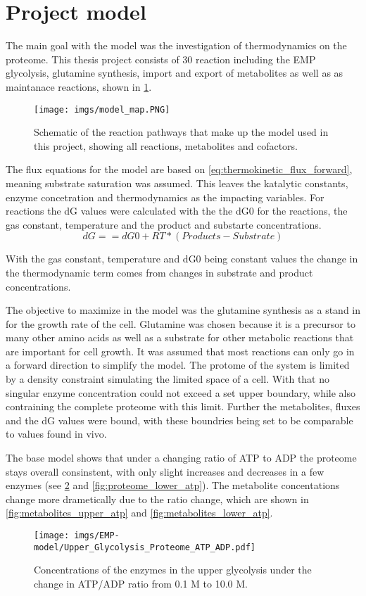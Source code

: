 \section{Project model}
The main goal with the model was the investigation of thermodynamics on the proteome. 
This thesis project consists of 30 reaction including the EMP glycolysis, glutamine synthesis, import and export of metabolites as well as as maintanace reactions, shown in \ref{fig:model_map}. 
\begin{figure}[H]
    \centering
    \texttt{[image: imgs/model\_map.PNG]}
    \caption{Schematic of the reaction pathways that make up the model used in this project, showing all reactions, metabolites and cofactors.}
    \label{fig:model_map}
\end{figure}

The flux equations for the model are based on \ref{eq:thermokinetic_flux_forward}, meaning substrate saturation was assumed. This leaves the katalytic constants, enzyme concetration and thermodynamics as the impacting variables.
For reactions the dG values were calculated with the the dG0 for the reactions, the gas constant, temperature and the product and substarte concentrations.
\begin{equation}
    dG == dG0 + RT * (Products - Substrate)
    \label{eq:general_dG}
\end{equation}

With the gas constant, temperature and dG0 being constant values the change in the thermodynamic term comes from changes in substrate and product concentrations. 

The objective to maximize in the model was the glutamine synthesis as a stand in for the growth rate of the cell. Glutamine was chosen because it is a precursor to many other amino acids as well as a substrate for other metabolic reactions that are important for cell growth.
It was assumed that most reactions can only go in a forward direction to simplify the model. 
The protome of the system is limited by a density constraint simulating the limited space of a cell. With that no singular enzyme concentration could not exceed a set upper boundary, while also contraining the complete proteome with this limit.
Further the metabolites, fluxes and the dG values were bound, with these boundries being set to be comparable to values found in vivo. 

The base model shows that under a changing ratio of ATP to ADP the proteome stays overall consinstent, with only slight increases and decreases in a few enzymes (see \ref{fig:proteome_upper_atp} and \ref{fig:proteome_lower_atp}). The metabolite concentations change more drametically due to the ratio change, which are shown in \ref{fig:metabolites_upper_atp} and \ref{fig:metabolites_lower_atp}. 
\begin{figure}[H]
    \centering
    \texttt{[image: imgs/EMP-model/Upper\_Glycolysis\_Proteome\_ATP\_ADP.pdf]}
    \caption{Concentrations of the enzymes in the upper glycolysis under the change in ATP/ADP ratio from 0.1 M to 10.0 M.}
    \label{fig:proteome_upper_atp}
\end{figure}

